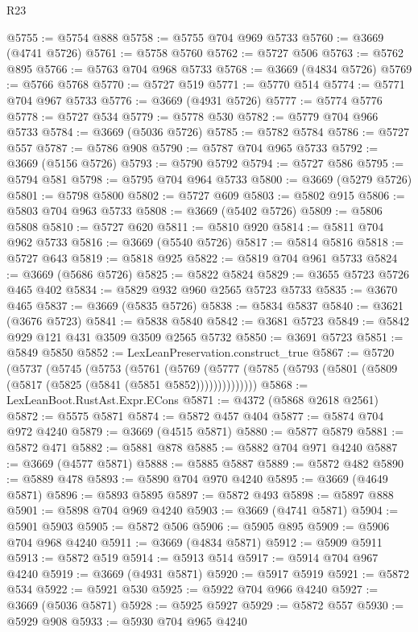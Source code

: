 \begin{lexlean}{R23}
\begin{coremodule}
@5755 := @5754 @888
@5758 := @5755 @704 @969 @5733
@5760 := @3669 (@4741 @5726)
@5761 := @5758 @5760
@5762 := @5727 @506
@5763 := @5762 @895
@5766 := @5763 @704 @968 @5733
@5768 := @3669 (@4834 @5726)
@5769 := @5766 @5768
@5770 := @5727 @519
@5771 := @5770 @514
@5774 := @5771 @704 @967 @5733
@5776 := @3669 (@4931 @5726)
@5777 := @5774 @5776
@5778 := @5727 @534
@5779 := @5778 @530
@5782 := @5779 @704 @966 @5733
@5784 := @3669 (@5036 @5726)
@5785 := @5782 @5784
@5786 := @5727 @557
@5787 := @5786 @908
@5790 := @5787 @704 @965 @5733
@5792 := @3669 (@5156 @5726)
@5793 := @5790 @5792
@5794 := @5727 @586
@5795 := @5794 @581
@5798 := @5795 @704 @964 @5733
@5800 := @3669 (@5279 @5726)
@5801 := @5798 @5800
@5802 := @5727 @609
@5803 := @5802 @915
@5806 := @5803 @704 @963 @5733
@5808 := @3669 (@5402 @5726)
@5809 := @5806 @5808
@5810 := @5727 @620
@5811 := @5810 @920
@5814 := @5811 @704 @962 @5733
@5816 := @3669 (@5540 @5726)
@5817 := @5814 @5816
@5818 := @5727 @643
@5819 := @5818 @925
@5822 := @5819 @704 @961 @5733
@5824 := @3669 (@5686 @5726)
@5825 := @5822 @5824
@5829 := @3655 @5723 @5726 @465 @402
@5834 := @5829 @932 @960 @2565 @5723 @5733
@5835 := @3670 @465
@5837 := @3669 (@5835 @5726)
@5838 := @5834 @5837
@5840 := @3621 (@3676 @5723)
@5841 := @5838 @5840
@5842 := @3681 @5723
@5849 := @5842 @929 @121 @431 @3509 @3509 @2565 @5732
@5850 := @3691 @5723
@5851 := @5849 @5850
@5852 := LexLeanPreservation.construct_true
@5867 := @5720
    (@5737
      (@5745
        (@5753
          (@5761
            (@5769
              (@5777 (@5785 (@5793 (@5801 (@5809 (@5817 (@5825 (@5841 (@5851 @5852))))))))))))))
@5868 := LexLeanBoot.RustAst.Expr.ECons
@5871 := @4372 (@5868 @2618 @2561)
@5872 := @5575 @5871
@5874 := @5872 @457 @404
@5877 := @5874 @704 @972 @4240
@5879 := @3669 (@4515 @5871)
@5880 := @5877 @5879
@5881 := @5872 @471
@5882 := @5881 @878
@5885 := @5882 @704 @971 @4240
@5887 := @3669 (@4577 @5871)
@5888 := @5885 @5887
@5889 := @5872 @482
@5890 := @5889 @478
@5893 := @5890 @704 @970 @4240
@5895 := @3669 (@4649 @5871)
@5896 := @5893 @5895
@5897 := @5872 @493
@5898 := @5897 @888
@5901 := @5898 @704 @969 @4240
@5903 := @3669 (@4741 @5871)
@5904 := @5901 @5903
@5905 := @5872 @506
@5906 := @5905 @895
@5909 := @5906 @704 @968 @4240
@5911 := @3669 (@4834 @5871)
@5912 := @5909 @5911
@5913 := @5872 @519
@5914 := @5913 @514
@5917 := @5914 @704 @967 @4240
@5919 := @3669 (@4931 @5871)
@5920 := @5917 @5919
@5921 := @5872 @534
@5922 := @5921 @530
@5925 := @5922 @704 @966 @4240
@5927 := @3669 (@5036 @5871)
@5928 := @5925 @5927
@5929 := @5872 @557
@5930 := @5929 @908
@5933 := @5930 @704 @965 @4240

\end{coremodule}
\end{lexlean}
